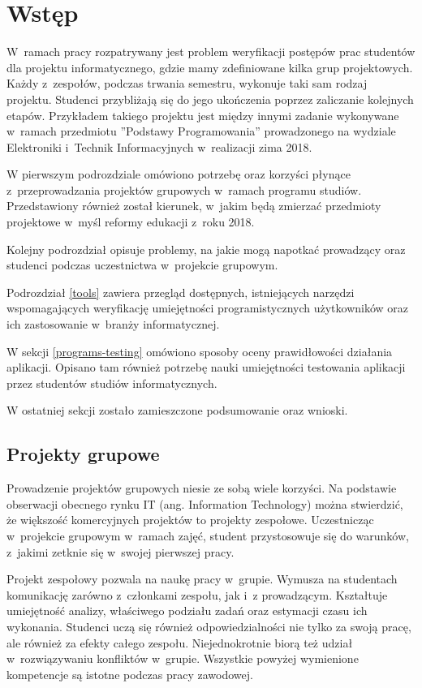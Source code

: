 \chapter{Wstęp}
\label{chapter:intro}

W~ramach pracy rozpatrywany jest problem weryfikacji postępów prac studentów dla projektu informatycznego, gdzie mamy zdefiniowane kilka grup projektowych.
Każdy z~zespołów, podczas trwania semestru, wykonuje taki sam rodzaj projektu.
Studenci przybliżają się do jego ukończenia poprzez zaliczanie kolejnych etapów.
Przykładem takiego projektu jest między innymi zadanie wykonywane w~ramach przedmiotu ”Podstawy Programowania” prowadzonego na wydziale Elektroniki i~Technik Informacyjnych w~realizacji zima 2018.

W pierwszym podrozdziale omówiono potrzebę oraz korzyści płynące z~przeprowadzania projektów grupowych w~ramach programu studiów.
Przedstawiony również został kierunek, w~jakim będą zmierzać przedmioty projektowe w~myśl reformy edukacji z~roku 2018.

Kolejny podrozdział opisuje problemy, na jakie mogą napotkać prowadzący oraz studenci podczas uczestnictwa w~projekcie grupowym.

Podrozdział \ref{tools} zawiera przegląd dostępnych, istniejących narzędzi wspomagających weryfikację umiejętności programistycznych użytkowników oraz ich zastosowanie w~branży informatycznej.

W sekcji \ref{programs-testing} omówiono sposoby oceny prawidłowości działania aplikacji.
Opisano tam również potrzebę nauki umiejętności testowania aplikacji przez studentów studiów informatycznych.

W ostatniej sekcji zostało zamieszczone podsumowanie oraz wnioski.


\section{Projekty grupowe}

Prowadzenie projektów grupowych niesie ze sobą wiele korzyści.
Na podstawie obserwacji obecnego rynku IT (ang. Information Technology) można stwierdzić, że większość komercyjnych projektów to projekty zespołowe.
Uczestnicząc w~projekcie grupowym w~ramach zajęć, student przystosowuje się do warunków, z~jakimi zetknie się w~swojej pierwszej pracy.

Projekt zespołowy pozwala na naukę pracy w~grupie.
Wymusza na studentach komunikację zarówno z~członkami zespołu, jak i~z prowadzącym.
Kształtuje umiejętność analizy, właściwego podziału zadań oraz estymacji czasu ich wykonania.
Studenci uczą się również odpowiedzialności nie tylko za swoją pracę, ale również za efekty całego zespołu.
Niejednokrotnie biorą też udział w~rozwiązywaniu konfliktów w~grupie.
Wszystkie powyżej wymienione kompetencje są istotne podczas pracy zawodowej.



